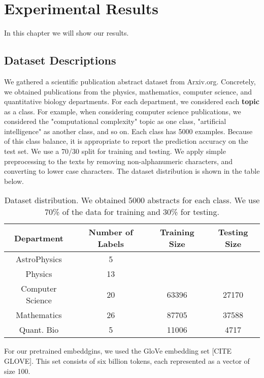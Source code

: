 
\chapter{Experimental Results} \label{Results}
In this chapter we will show our results.

\section{Dataset Descriptions}

We gathered a scientific publication abstract dataset from Arxiv.org. Concretely, we obtained
publications from the physics, mathematics, computer science, and quantitative biology departments.
For each department, we considered each \textbf{topic} as a
class. For example, when considering computer science publications, we considered the
"computational complexity" topic as one class, "artificial intelligence" as another class,
and so on. Each class has 5000 examples. Because of this class balance, it is appropriate to report the prediction
accuracy on the test set. We use a 70/30 split for training and testing. We apply simple preprocessing to the texts by removing non-alphanumeric
characters, and converting to lower case characters. The dataset distribution is shown in the table below.

\begin{center}\begin{table}\begin{tabular}{||c c c c||}
 \hline
 Department & Number of Labels & Training Size & Testing Size\\ [0.5ex]
 \hline\hline
AstroPhysics & 5\\
Physics & 13\\
Computer Science & 20 & 63396 & 27170 \\
Mathematics & 26 & 87705 & 37588 \\
Quant. Bio & 5 & 11006 & 4717\\
 [1ex]\hline\end{tabular}\caption{Dataset distribution. We obtained 5000 abstracts for each class. We use 70\% of the data for
 training and 30\% for testing.}\end{table}\end{center}

For our pretrained embeddgins, we used the GloVe embedding set [CITE GLOVE]. This set consists of six billion tokens, each represented
as a vector of size 100.

